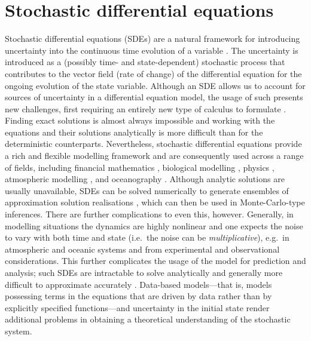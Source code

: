 \section{Stochastic differential equations}
Stochastic differential equations (SDEs) are a natural framework for introducing uncertainty into the continuous time evolution of a variable \citep{Oksendal_2003_StochasticDifferentialEquations,SarkkaSolin_2019_AppliedStochasticDifferential,KallianpurSundar_2014_StochasticAnalysisDiffusion,Penland_2003_StochasticApproachNonlinear}.
The uncertainty is introduced as a (possibly time- and state-dependent) stochastic process that contributes to the vector field (rate of change) of the differential equation for the ongoing evolution of the state variable.
Although an SDE allows us to account for sources of uncertainty in a differential equation model, the usage of such presents new challenges, first requiring an entirely new type of calculus to formulate \citep{Ito_1944_StochasticIntegral,Ito_1946_StochasticIntegralEquation}.
Finding exact solutions is almost always impossible and working with the equations and their solutions analytically is more difficult than for the deterministic counterparts.
Nevertheless, stochastic differential equations provide a rich and flexible modelling framework and are consequently used across a range of fields, including financial mathematics \citep{KabanovEtAl_2006_StochasticCalculusMathematical}, biological modelling \citep[e.g.]{PreislerEtAl_2004_ModelingAnimalMovements,BacharEtAl_2013_StochasticBiomathematicalModels}, physics \citep[e.g.]{StraussEffenberger_2017_HitchhikerGuideStochastic,GardinerEtAl_1992_WavefunctionQuantumStochastic}, atmospheric modelling \citep{WilsonSawford_1996_ReviewLagrangianStochastic}, and oceanography \citep{BerloffMcWilliams_2002_MaterialTransportOceanic}.
Although analytic solutions are usually unavailable, SDEs can be solved numerically to generate ensembles of approximation solution realisations \citep{KloedenPlaten_1992_NumericalSolutionStochastic}, which can then be used in Monte-Carlo-type inferences.
There are further complications to even this, however.
Generally, in modelling situations the dynamics are highly nonlinear and one expects the noise to vary with both time and state (i.e.\ the noise can be \emph{multiplicative}), e.g.\ in atmospheric \citep{SuraEtAl_2005_MultiplicativeNoiseNonGaussianity,Sura_2003_StochasticAnalysisSouthern} and oceanic \citep{KamenkovichEtAl_2015_PropertiesOriginsAnisotropic} systems and from experimental and observational considerations.
This further complicates the usage of the model for prediction and analysis; such SDEs are intractable to solve analytically and generally more difficult to approximate accurately \citep{MoraEtAl_2017_StableNumericalScheme,SanchoEtAl_1982_AnalyticalNumericalStudies}.
Data-based models---that is, models possessing terms in the equations that are driven by data rather than by explicitly specified functions---and uncertainty in the initial state render additional problems in obtaining a theoretical understanding of the stochastic system.

